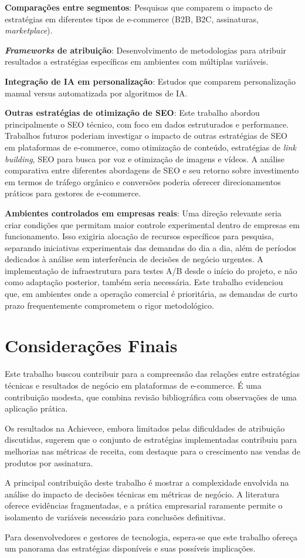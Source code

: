\textbf{Comparações entre segmentos}: Pesquisas que comparem o impacto de estratégias em diferentes tipos de e-commerce (B2B, B2C, assinaturas, \textit{marketplace}).

\textbf{\textit{Frameworks} de atribuição}: Desenvolvimento de metodologias para atribuir resultados a estratégias específicas em ambientes com múltiplas variáveis.

\textbf{Integração de IA em personalização}: Estudos que comparem personalização manual versus automatizada por algoritmos de IA.

\textbf{Outras estratégias de otimização de SEO}: Este trabalho abordou principalmente o SEO técnico, com foco em dados estruturados e performance. Trabalhos futuros poderiam investigar o impacto de outras estratégias de SEO em plataformas de e-commerce, como otimização de conteúdo, estratégias de \textit{link building}, SEO para busca por voz e otimização de imagens e vídeos. A análise comparativa entre diferentes abordagens de SEO e seu retorno sobre investimento em termos de tráfego orgânico e conversões poderia oferecer direcionamentos práticos para gestores de e-commerce.

\textbf{Ambientes controlados em empresas reais}: Uma direção relevante seria criar condições que permitam maior controle experimental dentro de empresas em funcionamento. Isso exigiria alocação de recursos específicos para pesquisa, separando iniciativas experimentais das demandas do dia a dia, além de períodos dedicados à análise sem interferência de decisões de negócio urgentes. A implementação de infraestrutura para testes A/B desde o início do projeto, e não como adaptação posterior, também seria necessária. Este trabalho evidenciou que, em ambientes onde a operação comercial é prioritária, as demandas de curto prazo frequentemente comprometem o rigor metodológico.

\section{Considerações Finais}

Este trabalho buscou contribuir para a compreensão das relações entre estratégias técnicas e resultados de negócio em plataformas de e-commerce. É uma contribuição modesta, que combina revisão bibliográfica com observações de uma aplicação prática.

Os resultados na Achievece, embora limitados pelas dificuldades de atribuição discutidas, sugerem que o conjunto de estratégias implementadas contribuiu para melhorias nas métricas de receita, com destaque para o crescimento nas vendas de produtos por assinatura.

A principal contribuição deste trabalho é mostrar a complexidade envolvida na análise do impacto de decisões técnicas em métricas de negócio. A literatura oferece evidências fragmentadas, e a prática empresarial raramente permite o isolamento de variáveis necessário para conclusões definitivas.

Para desenvolvedores e gestores de tecnologia, espera-se que este trabalho ofereça um panorama das estratégias disponíveis e suas possíveis implicações.


